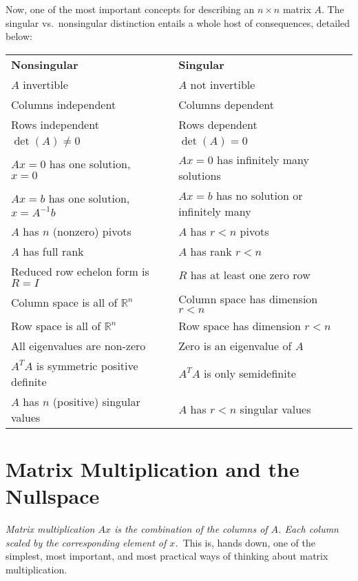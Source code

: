 \documentclass[12pt]{article}
\theoremstyle{plain}
\theoremstyle{definition}
\theoremstyle{remark}
\begin{document}
Now, one of the most important concepts for describing an $n\times n$
matrix $A$. The singular vs.\ nonsingular distinction entails a whole
host of consequences, detailed below:
\begin{table}[h!]
\centering
\begin{tabular}{lll}
\textbf{Nonsingular}                     && \textbf{Singular} \\
$A$ invertible                           && $A$ not invertible \\
Columns independent                      && Columns dependent \\
Rows independent                         && Rows dependent \\
$\det(A)\neq0$                           && $\det(A)=0$ \\
$Ax = 0$ has one solution, $x = 0$       && $Ax=0$ has infinitely many solutions\\
$Ax = b$ has one solution, $x = A^{-1}b$ && $Ax = b$ has no solution or infinitely many \\
$A$ has $n$ (nonzero) pivots             && $A$ has $r<n$ pivots \\
$A$ has full rank                        && $A$ has rank $r<n$ \\
Reduced row echelon form is $R = I$      && $R$ has at least one zero row \\
Column space is all of $\mathbb{R}^n$    && Column space has dimension $r<n$ \\
Row space is all of $\mathbb{R}^n$       && Row space has dimension $r<n$ \\
All eigenvalues are non-zero             && Zero is an eigenvalue of $A$ \\
$A^T A$ is symmetric positive definite   && $A^T A$ is only semidefinite \\
$A$ has $n$ (positive) singular values   && $A$ has $r<n$ singular values
\end{tabular}
\end{table}

\section{Matrix Multiplication and the Nullspace}

{\sl Matrix multiplication $Ax$ is the combination of the columns of
$A$. Each column scaled by the corresponding element of $x$.}\ This is,
hands down, one of the simplest, most important, and most practical ways
of thinking about matrix multiplication.
\end{document}
